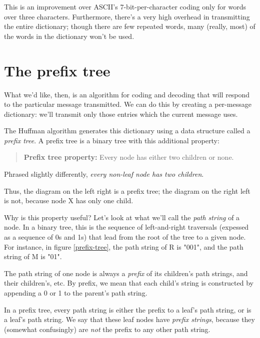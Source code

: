 This is an improvement over ASCII's 7-bit-per-character coding only for words over three characters. Furthermore, there's a very high overhead in transmitting the entire dictionary; though there are few repeated words, many (really, most) of the words in the dictionary won't be used. 

\section{The prefix tree}

What we'd like, then, is an algorithm for coding and decoding that will respond to the particular message transmitted. We can do this by creating a per-message dictionary: we'll transmit only those entries which the current message uses.

The Huffman algorithm generates this dictionary using a data structure called a \textit{prefix tree}. A prefix tree is a binary tree with this additional property:
\begin{quotation}
\textbf{Prefix tree property:} Every node has either two children or none.
\end{quotation}
Phrased slightly differently, {\em every non-leaf node has two children}.

\begin{figure}[prefix-tree]
\end{figure}
\begin{figure}[not-a-prefix-tree]
\end{figure}
Thus, the diagram on the {left right} is a prefix tree; the diagram on the {right left} is not, because node X has only one child.

Why is this property useful? Let's look at what we'll call the \textit{path string} of a node. In a binary tree, this is the sequence of left-and-right traversals (expessed as a sequence of 0s and 1s) that lead from the root of the tree to a given node. For instance, in figure \ref{prefix-tree}, the path string of R is "001", and the path string of M is "01".

The path string of one node is always a \textit{prefix} of its children's path strings, and their children's, etc. By prefix, we mean that each child's string is constructed by appending a 0 or 1 to the parent's path string.

In a prefix tree, every path string is either the prefix to a leaf's path string, or is a leaf's path string. We say that these leaf nodes have \textit{prefix strings}, because they (somewhat confusingly) are \textit{not} the prefix to any other path string.

